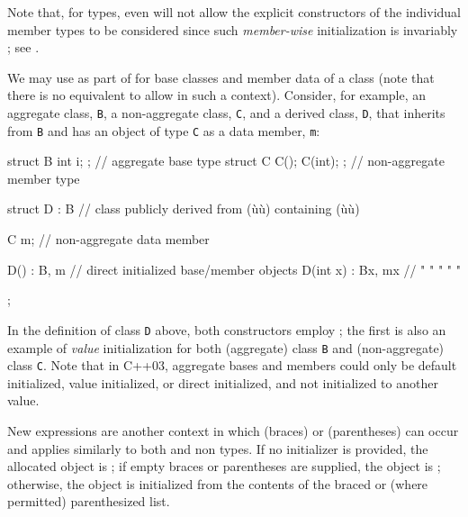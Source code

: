 Note that, for  types, even  will not allow the explicit constructors of the
individual member types to be considered since such \emph{member-wise}
initialization is invariably ; see
.

We may use  as part of  for base classes and member data of a class (note
that there is no equivalent to allow 
in such a context). Consider, for example, an aggregate class,
\lstinline!B!, a non-aggregate class, \lstinline!C!, and a derived class,
\lstinline!D!, that inherits from \lstinline!B! and has an object of type
\lstinline!C! as a data member, \lstinline!m!:

\begin{emcppslisting}
struct B { int i; };        // aggregate base type
struct C { C(); C(int); };  // non-aggregate member type

struct D : B  // class publicly derived from (ù{}ù) containing (ù{}ù)
{
    C m;  // non-aggregate data member

    D()      : B{},  m{}  { }  // direct initialized base/member objects
    D(int x) : B{x}, m{x} { }  //    "       "        "     "       "
};
\end{emcppslisting}


\noindent In the definition of class \lstinline!D! above, both constructors employ
; the first is also an example of
\emph{value} initialization for both (aggregate) class \lstinline!B! and
(non-aggregate) class \lstinline!C!. Note that in C++03, aggregate bases
and members could only be default initialized, value initialized, or
direct initialized, and not initialized to another value.

New expressions are another context in which  (braces) or  (parentheses)
can occur and applies similarly to both  and
non types. If no initializer is provided, the
allocated object is ; if empty braces or
parentheses are supplied, the object is ;
otherwise, the object is initialized from the contents of the braced or
(where permitted) parenthesized list.

